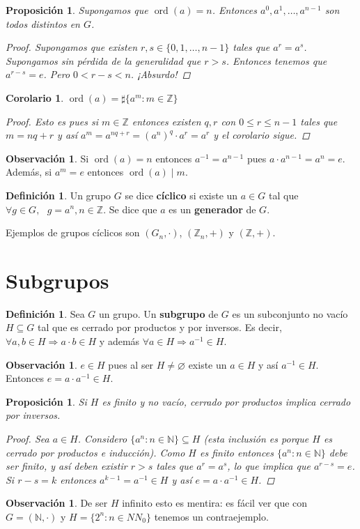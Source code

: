 \documentclass[12pt]{book}
\newtheorem{prop}[teo]{Proposición}
\newtheorem{cor}[teo]{Corolario}
\theoremstyle{definition}
\newtheorem{obs}[teo]{Observación}
\newtheorem{defn}[teo]{Definición}
\newcommand{\ZZ}{\mathbb{Z}}      %
\newcommand{\NN}{\mathbb{N}}
\let\emptyset\varnothing
\DeclareMathOperator{\ord}{ord}
\begin{document}
\begin{prop} Supongamos que $\ord(a)=n$. Entonces $a^0, a^1 , \ldots , a^{n-1}$ son todos distintos en $G$.
\begin{proof}
Supongamos que existen $r,s\in\{0,1,\ldots , n-1\}$ tales que $a^r = a^s$. Supongamos sin pérdida de la generalidad que $r>s$. Entonces tenemos que $a^{r-s} = e$. Pero $0<r-s<n$. ¡Absurdo!
\end{proof}
\end{prop}
\begin{cor}
$\ord(a) = \sharp\{a^m : m\in\ZZ\}$ \begin{proof}Esto es pues si $m\in\ZZ$ entonces existen $q,r$ con $0\leq r \leq n-1$ tales que $m=nq+r$ y así $a^m = a^{nq+r} = (a^n)^q \cdot a^r = a^r$ y el corolario sigue.\end{proof}
\end{cor}

\begin{obs}
Si $\ord(a)=n$ entonces $a^{-1} = a^{n-1}$ pues $a\cdot a^{n-1} = a^n = e$. Además, si $a^m = e$ entonces $\ord(a)\mid m$.
\end{obs}

\begin{defn}
Un grupo $G$ se dice \textbf{cíclico} si existe un $a\in G$ tal que $\forall g\in G, \text{ } g=a^n, n\in\ZZ$. Se dice que $a$ es un \textbf{generador} de $G$.
\end{defn}

Ejemplos de grupos cíclicos son $(G_n,\cdot)$, $(\ZZ_n,+)$ y $(\ZZ,+)$.

\section{Subgrupos}

\begin{defn}
Sea $G$ un grupo. Un \textbf{subgrupo} de $G$ es un subconjunto no vacío $H\subseteq G$ tal que es cerrado por productos y por inversos. Es decir, $\forall a,b\in H \Longrightarrow a\cdot b \in H$ y además $\forall a\in H\Longrightarrow a^{-1}\in H$.
\end{defn}

\begin{obs}
$e\in H$ pues al ser $H\neq \emptyset$ existe un $a\in H$ y así $a^{-1}\in H$. Entonces $e = a\cdot a^{-1} \in H$.
\end{obs}
\begin{prop}
Si $H$ es finito y no vacío, cerrado por productos implica cerrado por inversos.
\begin{proof}
Sea $a\in H$. Considero $\{a^n : n\in\NN\}\subseteq H$ (esta inclusión es porque $H$ es cerrado por productos e inducción). Como $H$ es finito entonces $\{a^n : n\in\NN\}$ debe ser finito, y así deben existir $r>s$ tales que $a^r = a^s$, lo que implica que $a^{r-s}=e$. Si $r-s=k$ entonces $a^{k-1}=a^{-1}\in H$ y así $e= a\cdot a^{-1}\in H$.
\end{proof}
\end{prop}
\begin{obs}
De ser $H$ infinito esto es mentira: es fácil ver que con $G=(\NN,\cdot)$ y $H=\{2^n : n\in NN_0\}$ tenemos un contraejemplo.
\end{obs}
\end{document}
